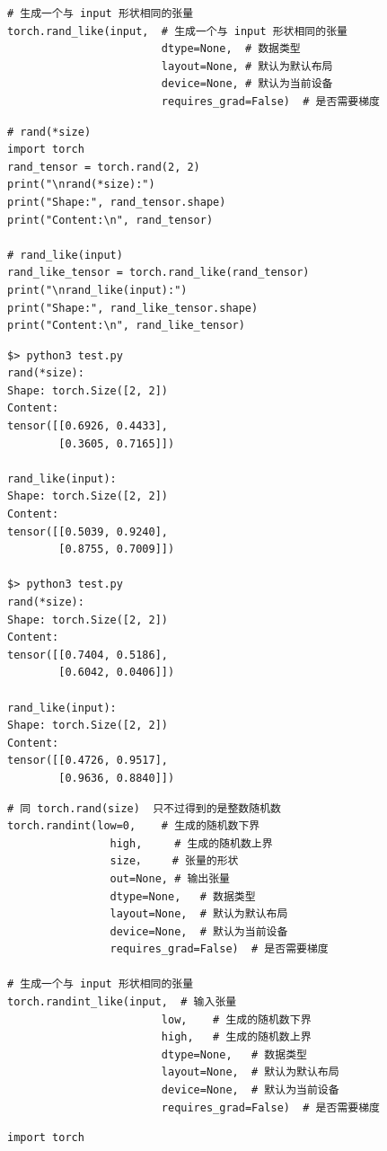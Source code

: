 \begin{enumerate}[label=\arabic*)]
\begin{lstlisting}[style=demostyle,numbers=none]
# 生成一个与 input 形状相同的张量
torch.rand_like(input,  # 生成一个与 input 形状相同的张量
                        dtype=None,  # 数据类型
                        layout=None, # 默认为默认布局
                        device=None, # 默认为当前设备
                        requires_grad=False)  # 是否需要梯度
\end{lstlisting}
\begin{lstlisting}[style=pythonstyle]
# rand(*size)
import torch
rand_tensor = torch.rand(2, 2)
print("\nrand(*size):")
print("Shape:", rand_tensor.shape)
print("Content:\n", rand_tensor)

# rand_like(input)
rand_like_tensor = torch.rand_like(rand_tensor)
print("\nrand_like(input):")
print("Shape:", rand_like_tensor.shape)
print("Content:\n", rand_like_tensor)
\end{lstlisting}
\begin{lstlisting}[style=demostyle,numbers=none]
$> python3 test.py
rand(*size):
Shape: torch.Size([2, 2])
Content:
tensor([[0.6926, 0.4433],
        [0.3605, 0.7165]])

rand_like(input):
Shape: torch.Size([2, 2])
Content:
tensor([[0.5039, 0.9240],
        [0.8755, 0.7009]])

$> python3 test.py
rand(*size):
Shape: torch.Size([2, 2])
Content:
tensor([[0.7404, 0.5186],
        [0.6042, 0.0406]])

rand_like(input):
Shape: torch.Size([2, 2])
Content:
tensor([[0.4726, 0.9517],
        [0.9636, 0.8840]])
\end{lstlisting}

\begin{lstlisting}[style=demostyle,numbers=none]
# 同 torch.rand(size)  只不过得到的是整数随机数
torch.randint(low=0,    # 生成的随机数下界
                high,     # 生成的随机数上界
                size，    # 张量的形状
                out=None, # 输出张量
                dtype=None,   # 数据类型
                layout=None,  # 默认为默认布局
                device=None,  # 默认为当前设备
                requires_grad=False)  # 是否需要梯度

# 生成一个与 input 形状相同的张量
torch.randint_like(input,  # 输入张量
                        low,    # 生成的随机数下界
                        high,   # 生成的随机数上界
                        dtype=None,   # 数据类型
                        layout=None,  # 默认为默认布局
                        device=None,  # 默认为当前设备
                        requires_grad=False)  # 是否需要梯度
\end{lstlisting}
\begin{lstlisting}[style=pythonstyle]
import torch


\end{lstlisting}
\end{enumerate}
